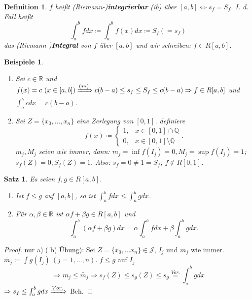 \documentclass{extreport}
\newcommand{\Q}{\mathbb{Q}}
\newcommand{\R}{\mathbb{R}}
\theoremstyle{named}
\theoremstyle{dotless}
\newtheorem{satz}[namedtheorem]{Satz}
\newtheorem*{beispiele}{Beispiele}
\newtheorem*{definition}{Definition}
\begin{document}
   
\begin{definition}
	$f$ hei{\ss}t (Riemann-)\textbf{integrierbar} (ib) über $[a, b] \iff s_{f} = S_{f}$. I. d. Fall hei{\ss}t
		$$ \int_{a}^{b} f dx \coloneqq \int_{a}^{b} f(x) dx \coloneqq S_{f} (= s_{f}) $$
	das (Riemann-)\textbf{Integral}	von $f$ über $[a, b]$ und wir schreiben: $f \in R[a, b]$.
\end{definition}


\begin{beispiele} ~\
	\begin{enumerate}
		\item Sei $c \in \R$ und $f(x) = c ~(x \in [a, b]) \xRightarrow[]{(**)} c (b - a) \leq s_{f} \leq S_{f} \leq c(b- a) \Rightarrow f \in R[a, b]$ und $\int_{a}^{b}c dx = c(b - a)$.
		\item Sei $Z = \{ x_{0}, \dotsc, x_{n} \}$ eine Zerlegung von $[0, 1]$. definiere
			$$ f(x) \coloneqq \begin{cases} 1, & x \in [0, 1] \cap \Q \\ 0, & x \in [0, 1] \setminus \Q \end{cases}. $$  
			$m_{j}, M_{j}$ seien wie immer, dann: $m_{j} = \inf f(I_{j}) = 0, M_{j} = \sup f(I_{j}) = 1$; $s_{f}(Z) = 0, S_{f}(Z) = 1$. Also: $s_{f} = 0 \neq 1 = S_{f}$; $f \notin R[0, 1]$.
	\end{enumerate}	
\end{beispiele}

\begin{satz} \label{10.2:satz}
	Es seien $f, g \in R[a, b]$.
	\begin{enumerate}
		\item Ist $f \leq g$ auf $[a, b]$, so ist $\int_{a}^{b} f dx \leq \int_{a}^{b} g dx$.
		\item Für $\alpha, \beta \in \R$ ist $\alpha f + \beta g \in R[a, b]$ und
			$$ \int_{a}^{b} (\alpha f + \beta g) dx = \alpha \int_{a}^{b} f dx + \beta \int_{a}^{b} g dx. $$
	\end{enumerate}
\end{satz}

\begin{proof}
	nur a) ( b) Übung): Sei $Z = \{ x_{0}, \dotsc x_{n} \} \in \mathcal{J}$, $I_{j}$ und $m_{j}$ wie immer. $\tilde{m_{j}} \coloneqq \int g(I_{j}) ~(j = 1, \dotsc, n)$. $f \leq g$ auf $I_{j}$
		$$ \Rightarrow m_{j} \leq \tilde{m_{j}} \Rightarrow s_{f}(Z) \leq s_{g}(Z) \leq s_{g} \overset{Vor.}{=} \int_{a}^{b} g dx $$ 
		$\Rightarrow s_{f} \leq \int_{a}^{b} g dx \xRightarrow[]{Vor.}$ Beh.
\end{proof}
\end{document}
